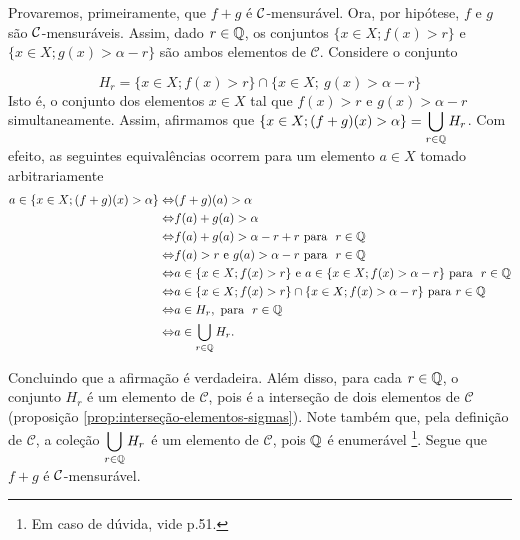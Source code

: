 \begin{prova}
    Provaremos, primeiramente, que $f+g$ é $\operatorname{\mathcal{C}}$-mensurável.
    Ora, por hipótese, $f$ e $g$ são $\operatorname{\mathcal{C}}$-mensuráveis. 
    Assim, dado $r \in \operatorname{\mathbb{Q}}$, os conjuntos $\{x \in X; f(x) > r\}$ e 
    $\{x \in X; g(x) > \alpha -r\}$ são ambos elementos de $\mathcal{C}$.
    Considere o conjunto  
    
    $$H_r = \{x \in X; f(x) > r\} \cap \{x \in X;\ g(x) > \alpha -r\}$$
    Isto é, o conjunto dos elementos $x \in X$ tal que $f(x) 
    > r$ e $g(x) >\alpha -r$ simultaneamente.
    Assim, afirmamos que $\{x \in X; (f+g)(x) > \alpha\} = \displaystyle \bigcup_{r \in \operatorname{\mathbb{Q}}} H_r$. Com efeito, as seguintes equivalências ocorrem para um elemento $a \in X$ tomado arbitrariamente
        \begin{align*}
            a \in \{x \in X; (f+g)(x) > \alpha\} 
            \Leftrightarrow  & (f+g)(a) >\alpha \\
            \Leftrightarrow & f(a) +g(a) > \alpha \\
            \Leftrightarrow & f(a) + g(a) > \alpha -r + r\ \textrm{para } \ r \in \Q\\
            \Leftrightarrow & f(a) > r \textrm{\ e\ } g(a) > \alpha -r\ \textrm{para  } \ r \in \Q\\
            \Leftrightarrow & a \in \{x \in X; f(x) > r\} \textrm{\ e\ } a \in \{x \in X; f(x) > \alpha - r\}\  \textrm{para  } \ r \in \Q\\
            \Leftrightarrow & a \in \{x \in X; f(x) > r\} \cap \{x \in X; f(x) > \alpha - r\}\  \textrm{para  }  r \in \Q\\
            \Leftrightarrow & a \in H_r,\ \textrm{para  } \ r \in \Q\\
            \Leftrightarrow &a \in \bigcup_{r \in \Q} H_r.
        \end{align*}
    
    Concluindo que a afirmação é verdadeira. 
    Além disso, para cada $r \in \operatorname{\mathbb{Q}}$, o conjunto $H_r$ é um elemento de $\mathcal{C}$, pois é  a interseção de dois elementos de $\mathcal{C}$ (proposição \ref{prop:interseção-elementos-sigmas}).
    Note também que, pela definição de $\mathcal{C}$, a coleção $\displaystyle \bigcup_{r \in \operatorname{\mathbb{Q}}} H_r$ é um elemento de $\mathcal{C}$, pois $\operatorname{\mathbb{Q}}$ é enumerável
    \footnote{Em caso de dúvida, vide \supercite{elon}{p.51}.}.
    Segue que $f+g$ é $\operatorname{\mathcal{C}}$-mensurável.


\end{prova}
